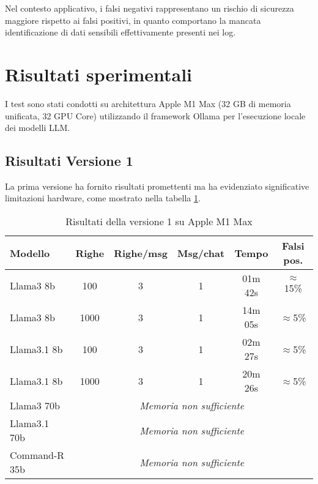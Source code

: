 \documentclass[12pt]{report}
\begin{document}
Nel contesto applicativo, i falsi negativi rappresentano un rischio di sicurezza maggiore rispetto ai falsi positivi, in quanto comportano la mancata identificazione di dati sensibili effettivamente presenti nei log.

\section{Risultati sperimentali}
\label{sec:risultati_sperimentali}

I test sono stati condotti su architettura Apple M1 Max (32 GB di memoria unificata, 32 GPU Core) utilizzando il framework Ollama per l'esecuzione locale dei modelli LLM.

\subsection{Risultati Versione 1}
\label{subsec:risultati_v1}

La prima versione ha fornito risultati promettenti ma ha evidenziato significative limitazioni hardware, come mostrato nella tabella \ref{tab:risultati_v1}.

\begin{table}[h!]
    \centering
    \begin{tabular}{|l|c|c|c|c|c|}
        \hline
        \textbf{Modello} & \textbf{Righe} & \textbf{Righe/msg} & \textbf{Msg/chat} & \textbf{Tempo} & \textbf{Falsi pos.} \\ \hline
        Llama3 8b & 100 & 3 & 1 & 01m 42s & $\approx$15\% \\ \hline
        Llama3 8b & 1000 & 3 & 1 & 14m 05s & $\approx$5\% \\ \hline
        Llama3.1 8b & 100 & 3 & 1 & 02m 27s & $\approx$5\% \\ \hline
        Llama3.1 8b & 1000 & 3 & 1 & 20m 26s & $\approx$5\% \\ \hline
        Llama3 70b & \multicolumn{5}{c|}{\textit{Memoria non sufficiente}} \\ \hline
        Llama3.1 70b & \multicolumn{5}{c|}{\textit{Memoria non sufficiente}} \\ \hline
        Command-R 35b & \multicolumn{5}{c|}{\textit{Memoria non sufficiente}} \\ \hline
    \end{tabular}
    \caption{Risultati della versione 1 su Apple M1 Max}
    \label{tab:risultati_v1}
\end{table}
\end{document}
